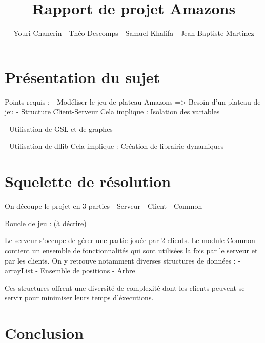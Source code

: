 \documentclass{article}
\author{Youri Chancrin - Théo Descomps - Samuel Khalifa - Jean-Baptiste Martinez}
\title{Rapport de projet Amazons}
\begin{document}
\maketitle

\section{Présentation du sujet}

Points requis :
- Modéliser le jeu de plateau Amazons
=> Besoin d'un plateau de jeu
- Structure Client-Serveur
Cela implique : Isolation des variables

- Utilisation de GSL et de graphes

- Utilisation de dllib
Cela implique : Création de librairie dynamiques

\section{Squelette de résolution}
On découpe le projet en 3 parties
- Serveur
- Client
- Common

Boucle de jeu : (à décrire)

Le serveur s'occupe de gérer une partie jouée par 2 clients. 
Le module Common contient un ensemble de fonctionnalités qui sont 
utilisées la fois par le serveur et par les clients. On y retrouve 
notamment diverses structures de données :
- arrayList
- Ensemble de positions
- Arbre

Ces structures offrent une diversité de complexité dont les clients 
peuvent se servir pour minimiser leurs temps d'éxecutions.

\section{}
\section{Conclusion}
\end{document}
